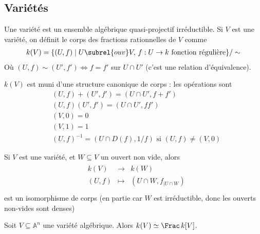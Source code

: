         \subsection{Variétés}
            \begin{defi}
                Une variété est un ensemble algébrique quasi-projectif irréductible. Si $V$ est une variété, on définit le corps des fractions rationnelles de $V$ comme
                \begin{align*}
                    k(V) = \{(U, f) \mid U \subrel{ouv} V,\, f : U \to k \text{ fonction régulière}\}/\sim
                \end{align*}
                Où $(U, f) \sim (U', f') \iff f = f'$ sur $U \cap U'$ (c'est une relation d'équivalence).
            \end{defi}
            \begin{remq}
                $k(V)$ est muni d'une structure canonique de corps : les opérations sont
                \begin{align*}
                    &(U,f) + (U',f') = (U \cap U', f + f') \\
                    &(U,f)(U',f') = (U \cap U', ff') \\
                    &(V,0) = 0 \\
                    &(V,1) = 1 \\
                    &(U,f)^{-1} = (U \cap D(f), 1/f) \text{ si } (U,f) \neq (V,0)
                \end{align*}
            \end{remq}
            \begin{remq}
                Si $V$ est une variété, et $W \subseteq V$ un ouvert non vide, alors 
                \begin{align*}
                    \begin{array}{cccc}
                        & k(V) & \to & k(W) \\
                        & (U,f) & \mapsto & (U \cap W, f_{|U \cap W}) \\
                    \end{array}
                \end{align*}
                est un isomorphisme de corps (en partie car $W$ est irréductible, donc les ouverts non-vides sont denses)
            \end{remq}
            \begin{lemm}
                Soit $V \subseteq \mathbb{A}^n$ une variété algébrique. Alors $k(V) \simeq \Frac\, k[V]$.
            \end{lemm}
